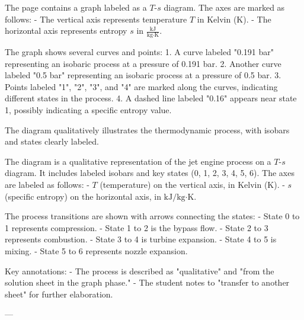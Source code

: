 The page contains a graph labeled as a \( T \)-\( s \) diagram. The axes are marked as follows:  
- The vertical axis represents temperature \( T \) in Kelvin (K).  
- The horizontal axis represents entropy \( s \) in \( \frac{\text{kJ}}{\text{kg·K}} \).  

The graph shows several curves and points:  
1. A curve labeled "0.191 bar" representing an isobaric process at a pressure of 0.191 bar.  
2. Another curve labeled "0.5 bar" representing an isobaric process at a pressure of 0.5 bar.  
3. Points labeled "1", "2", "3", and "4" are marked along the curves, indicating different states in the process.  
4. A dashed line labeled "0.16" appears near state 1, possibly indicating a specific entropy value.  

The diagram qualitatively illustrates the thermodynamic process, with isobars and states clearly labeled.

The diagram is a qualitative representation of the jet engine process on a \( T \)-\( s \) diagram. It includes labeled isobars and key states (0, 1, 2, 3, 4, 5, 6). The axes are labeled as follows:  
- \( T \) (temperature) on the vertical axis, in Kelvin (\( \text{K} \)).  
- \( s \) (specific entropy) on the horizontal axis, in \( \text{kJ}/\text{kg·K} \).  

The process transitions are shown with arrows connecting the states:  
- State 0 to 1 represents compression.  
- State 1 to 2 is the bypass flow.  
- State 2 to 3 represents combustion.  
- State 3 to 4 is turbine expansion.  
- State 4 to 5 is mixing.  
- State 5 to 6 represents nozzle expansion.  

Key annotations:  
- The process is described as "qualitative" and "from the solution sheet in the graph phase."  
- The student notes to "transfer to another sheet" for further elaboration.  

---